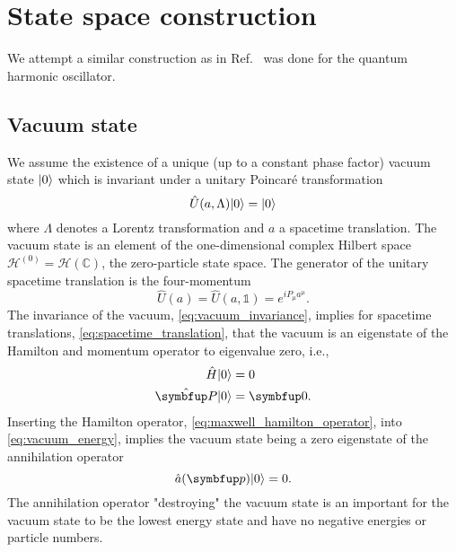 \section{State space construction}

% 
We attempt a similar construction as in Ref.~\cite[p.~506]{Cohen2019} was done for the quantum harmonic oscillator.

\subsection{Vacuum state}

We assume the existence of a unique (up to a constant phase factor) vacuum state $\lvert0\rangle$ which is invariant under a unitary Poincaré transformation~\cite[p.~97]{Streater2016}
\begin{equation}
	\hat{U}(a,\Lambda)
	\lvert0\rangle
	=
	\lvert0\rangle
	\label{eq:vacuum_invariance}
\end{equation}
where $\Lambda$ denotes a Lorentz transformation and $a$ a spacetime translation.
The vacuum state is an element of the one-dimensional complex Hilbert space $\mathcal{H}^{(0)}=\mathcal{H}(\mathbb{C})$, the zero-particle state space.
The generator of the unitary spacetime translation is the four-momentum~\cite[p.~28]{Haag2012}
\begin{equation}
	\hat{U}(a)
	=
	\hat{U}(a,\mathbb{1})
	=
	e^{iP_\mu a^\mu}
	\label{eq:spacetime_translation}
	.
\end{equation}
The invariance of the vacuum, \cref{eq:vacuum_invariance}, implies for spacetime translations, \cref{eq:spacetime_translation}, that the vacuum is an eigenstate of the Hamilton and momentum operator to eigenvalue zero, i.e.,
\begin{align}
	\hat{H}
	\ket{0}
	&=
	0
	\label{eq:vacuum_energy}
	\\
	\vu{P}
	\ket{0}
	&=
	\vb{0}
	\label{eq:vacuum_momentum}
	.	
\end{align}
Inserting the Hamilton operator, \cref{eq:maxwell_hamilton_operator}, into \cref{eq:vacuum_energy}, implies the vacuum state being a zero eigenstate of the annihilation operator
\begin{equation}
	\hat{a}(\vb{p})
	\ket{0}
	=
	0
	\label{eq:vacuum_annihilation}
	.
\end{equation}
The annihilation operator "destroying" the vacuum state is an important for the vacuum state to be the lowest energy state and have no negative energies or particle numbers.

